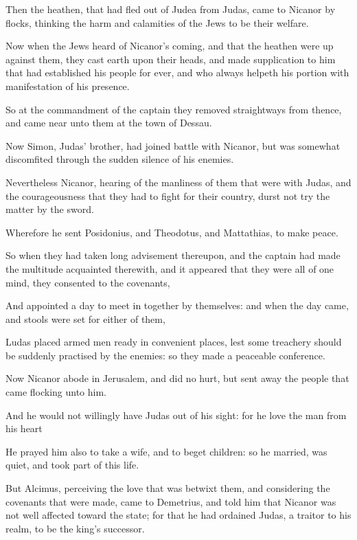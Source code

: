 {\par }{\PP {}Then the heathen, that had fled out of Judea from Judas, came to Nicanor by flocks, thinking the harm and calamities of the Jews to be their welfare.
\par }{\PP {}Now when the Jews heard of Nicanor’s coming, and that the heathen were up against them, they cast earth upon their heads, and made supplication to him that had established his people for ever, and who always helpeth his portion with manifestation of his presence.
\par }{\PP {}So at the commandment of the captain they removed straightways from thence, and came near unto them at the town of Dessau.
\par }{\PP {}Now Simon, Judas’ brother, had joined battle with Nicanor, but was somewhat discomfited through the sudden silence of his enemies.
\par }{\PP {}Nevertheless Nicanor, hearing of the manliness of them that were with Judas, and the courageousness that they had to fight for their country, durst not try the matter by the sword.
\par }{\PP {}Wherefore he sent Posidonius, and Theodotus, and Mattathias, to make peace.
\par }{\PP {}So when they had taken long advisement thereupon, and the captain had made the multitude acquainted therewith, and it appeared that they were all of one mind, they consented to the covenants,
\par }{\PP {}And appointed a day to meet in together by themselves: and when the day came, and stools were set for either of them,
\par }{\PP {}Ludas placed armed men ready in convenient places, lest some treachery should be suddenly practised by the enemies: so they made a peaceable conference.
\par }{\PP {}Now Nicanor abode in Jerusalem, and did no hurt, but sent away the people that came flocking unto him.
\par }{\PP {}And he would not willingly have Judas out of his sight: for he love the man from his heart
\par }{\PP {}He prayed him also to take a wife, and to beget children: so he married, was quiet, and took part of this life.
\par }{\PP {}But Alcimus, perceiving the love that was betwixt them, and considering the covenants that were made, came to Demetrius, and told him that Nicanor was not well affected toward the state; for that he had ordained Judas, a traitor to his realm, to be the king’s successor.
}
